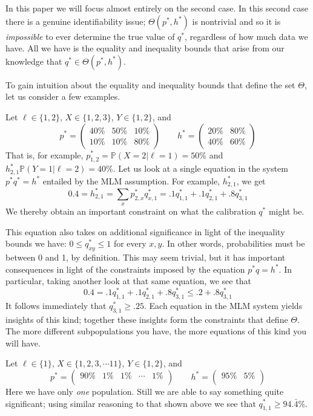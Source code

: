 In this paper we will focus almost entirely on the second case.  In this second case there is a genuine identifiability issue;  $\Theta(p^*,h^*)$ is nontrivial and so it is \emph{impossible} to ever determine the true value of $q^*$, regardless of how much data we have.  All we have is the equality and inequality bounds that arise from our knowledge that $q^* \in \Theta(p^*,h^*)$.  

To gain intuition about the equality and inequality bounds that define the set $\Theta$, let us consider a few examples.\vspace{.1in}

\begin{example}
Let $\ell \in \{1,2\}$, $X\in \{1,2,3\}$, $Y\in \{1,2\}$, and 
\[
p^{*}=\left(\begin{array}{ccc}
40\% & 50\% & 10\% \\
10\% & 10\% & 80\%
\end{array}\right)\qquad h^{*}=\left(\begin{array}{cc}
20\% & 80\% \\
40\% & 60\%
\end{array}\right)
\]
That is, for example, $p^*_{1,2}=\mathbb{P}(X=2|\ell=1)=50\%$ and $h^*_{2,1}\mathbb{P}(Y=1|\ell=2)=40\%$.  Let us look at a single equation in the system $p^* q^* = h^*$ entailed by the MLM assumption.  For example, $h^*_{2,1}$, we get
\[
0.4 = h^*_{2,1} = \sum_x p^*_{2,x} q^*_{x,1} = .1 q^*_{1,1} + .1 q^*_{2,1} + .8 q^*_{3,1} 
\]
We thereby obtain an important constraint on what the calibration $q^*$ might be.

This equation also takes on additional significance in light of the inequality bounds we have: $0\leq q^*_{xy}\leq 1$ for every $x,y$.  In other words, probabilities must be between 0 and 1, by definition.  This may seem trivial, but it has important consequences in light of the constraints imposed by the equation $p^*q=h^*$.  In particular, taking another look at that same equation, we see that
\[
0.4 = .1 q^*_{1,1} + .1 q^*_{2,1} + .8 q^*_{3,1} \leq .2 + .8 q^*_{3,1}
\]
It follows immediately that $q^*_{3,1}\geq .25$.  Each equation in the MLM system yields insights of this kind; together these insights form the constraints that define $\Theta$.  The more different subpopulations you have, the more equations of this kind you will have.  
\end{example}

\vspace{.1in}

\begin{example}
Let $\ell \in \{1\}$, $X\in \{1,2,3,\cdots 11\}$, $Y\in \{1,2\}$, and 
\[
p^{*}=\left(\begin{array}{ccccc}
90\% & 1\% & 1\% & \cdots & 1\% \\
\end{array}\right)\qquad h^{*}=\left(\begin{array}{cc}
95\% & 5\% \\
\end{array}\right)
\]
Here we have only \emph{one} population.  Still we are able to say something quite significant; using similar reasoning to that shown above we see that $q^*_{1,1}\geq 94.\bar4\%$.  
\end{example}

